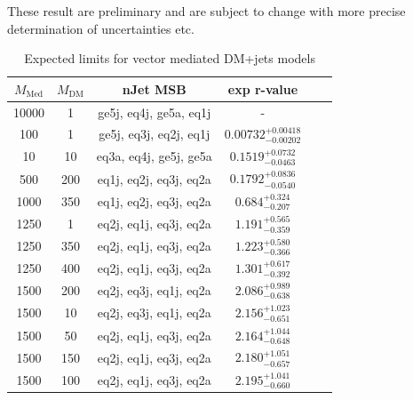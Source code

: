 These result are preliminary and are subject to change with more precise determination of uncertainties etc.
\begin{table}
  \centering
  \begin{tabular}{cccccc}
    \hline\hline
    $M_{\text{Med}}$ & $M_{\text{DM}}$ & nJet MSB & exp r-value \\
    \hline
    10000 & 1 & ge5j, eq4j, ge5a, eq1j & - \\
    100 & 1 & ge5j, eq3j, eq2j, eq1j & $0.00732_{-0.00202}^{+0.00418}$ \\
    10 & 10 & eq3a, eq4j, ge5j, ge5a & $0.1519_{-0.0463}^{+0.0732}$ \\
    500 & 200 & eq1j, eq2j, eq3j, eq2a & $0.1792_{-0.0540}^{+0.0836}$ \\
    1000 & 350 & eq1j, eq2j, eq3j, eq2a & $0.684_{-0.207}^{+0.324}$ \\
    1250 & 1 & eq2j, eq1j, eq3j, eq2a & $1.191_{-0.359}^{+0.565}$ \\
    1250 & 350 & eq2j, eq1j, eq3j, eq2a & $1.223_{-0.366}^{+0.580}$ \\
    1250 & 400 & eq2j, eq1j, eq3j, eq2a & $1.301_{-0.392}^{+0.617}$ \\
    1500 & 200 & eq2j, eq3j, eq1j, eq2a & $2.086_{-0.638}^{+0.989}$ \\
    1500 & 10 & eq2j, eq3j, eq1j, eq2a & $2.156_{-0.651}^{+1.023}$ \\
    1500 & 50 & eq2j, eq1j, eq3j, eq2a & $2.164_{-0.648}^{+1.044}$ \\
    1500 & 150 & eq2j, eq1j, eq3j, eq2a & $2.180_{-0.657}^{+1.051}$ \\
    1500 & 100 & eq2j, eq1j, eq3j, eq2a & $2.195_{-0.660}^{+1.041}$ \\
    \hline\hline
  \end{tabular}
  \caption{Expected limits for vector mediated DM+jets models}
  \label{tab:DMV_exp}
\end{table}



